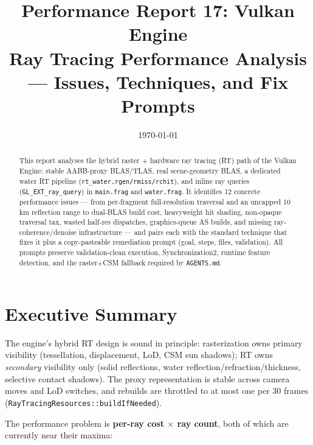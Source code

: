 \documentclass[11pt,a4paper]{article}
\title{Performance Report 17: Vulkan Engine \\
\large Ray Tracing Performance Analysis --- Issues, Techniques, and Fix Prompts}
\author{}
\date{\today}
\begin{document}
\maketitle

\begin{abstract}
This report analyses the hybrid raster $+$ hardware ray tracing (RT) path of the Vulkan Engine: stable AABB-proxy BLAS/TLAS, real scene-geometry BLAS, a dedicated water RT pipeline (\texttt{rt\_water.rgen/rmiss/rchit}), and inline ray queries (\texttt{GL\_EXT\_ray\_query}) in \texttt{main.frag} and \texttt{water.frag}. It identifies 12 concrete performance issues --- from per-fragment full-resolution traversal and an uncapped 10\,km reflection range to dual-BLAS build cost, heavyweight hit shading, non-opaque traversal tax, wasted half-res dispatches, graphics-queue AS builds, and missing ray-coherence/denoise infrastructure --- and pairs each with the standard technique that fixes it plus a copy-pasteable remediation prompt (goal, steps, files, validation). All prompts preserve validation-clean execution, Synchronization2, runtime feature detection, and the raster$+$CSM fallback required by \texttt{AGENTS.md}.
\end{abstract}

\tableofcontents
\newpage

\section{Executive Summary}

The engine's hybrid RT design is sound in principle: rasterization owns primary visibility (tessellation, displacement, LoD, CSM sun shadows); RT owns \textit{secondary} visibility only (solid reflections, water reflection/refraction/thickness, selective contact shadows). The proxy representation is stable across camera moves and LoD switches, and rebuilds are throttled to at most one per 30 frames (\texttt{RayTracingResources::buildIfNeeded}).

The performance problem is \textbf{per-ray cost $\times$ ray count}, both of which are currently near their maxima:
\end{document}
